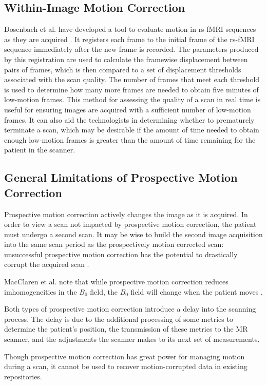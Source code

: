 \subsection{Within-Image Motion Correction}

Dosenbach et al. have developed a tool to evaluate motion in rs-fMRI sequences as they are acquired \cite{Dosenbach2017}. It registers each frame to the initial frame of the rs-fMRI sequence immediately after the new frame is recorded. The parameters produced by this registration are used to calculate the framewise displacement between pairs of frames, which is then compared to a set of displacement thresholds associated with the scan quality. The number of frames that meet each threshold is used to determine how many more frames are needed to obtain five minutes of low-motion frames. This method for assessing the quality of a scan in real time is useful for ensuring images are acquired with a sufficient number of low-motion frames. It can also aid the technologists in determining whether to prematurely terminate a scan, which may be desirable if the amount of time needed to obtain enough low-motion frames is greater than the amount of time remaining for the patient in the scanner. 


\subsection{General Limitations of Prospective Motion Correction}

Prospective motion correction actively changes the image as it is acquired. In order to view a scan not impacted by prospective motion correction, the patient must undergo a second scan. It may be wise to build the second image acquisition into the same scan period as the prospectively motion corrected scan: unsuccessful prospective motion correction has the potential to drastically corrupt the acquired scan \cite{Zaitsev2017}.

MacClaren et al. note that while prospective motion correction reduces imhomogeneities in the $B_0$ field, the $B_0$ field will change when the patient moves \cite{MacClaren2013}.

Both types of prospective motion correction introduce a delay into the scanning process. The delay is due to the additional processing of some metrics to determine the patient's position, the transmission of these metrics to the MR scanner, and the adjustments the scanner makes to its next set of measurements.

Though prospective motion correction has great power for managing motion during a scan, it cannot be used to recover motion-corrupted data in existing repositories.


